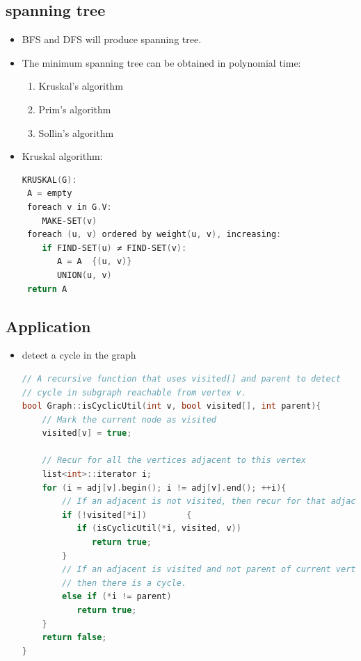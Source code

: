 \documentclass[a4paper,12pt,twoside]{book}
\begin{document}
\subsection{spanning tree}
\begin{itemize}
\item 	BFS and DFS will produce spanning tree. 
\item The minimum spanning tree can be obtained in polynomial time:
\begin{enumerate}
\item Kruskal's algorithm
\item Prim's algorithm
\item Sollin's algorithm
\end{enumerate}

\item Kruskal algorithm:
\begin{lstlisting}[frame=single, language=c++]
KRUSKAL(G):
 A = empty
 foreach v in G.V:
    MAKE-SET(v)
 foreach (u, v) ordered by weight(u, v), increasing:
    if FIND-SET(u) ≠ FIND-SET(v):
       A = A  {(u, v)}
       UNION(u, v)
 return A
\end{lstlisting}

\end{itemize}


\subsection{Application}
\begin{itemize}
\item detect a cycle in the graph
\begin{lstlisting}[frame=single, language=c++]
// A recursive function that uses visited[] and parent to detect
// cycle in subgraph reachable from vertex v.
bool Graph::isCyclicUtil(int v, bool visited[], int parent){
    // Mark the current node as visited
    visited[v] = true;
 
    // Recur for all the vertices adjacent to this vertex
    list<int>::iterator i;
    for (i = adj[v].begin(); i != adj[v].end(); ++i){
        // If an adjacent is not visited, then recur for that adjacent
        if (!visited[*i])        {
           if (isCyclicUtil(*i, visited, v))
              return true;
        }
        // If an adjacent is visited and not parent of current vertex,
        // then there is a cycle.
        else if (*i != parent)
           return true;
    }
    return false;
}
\end{lstlisting}

\end{itemize}
\end{document}
